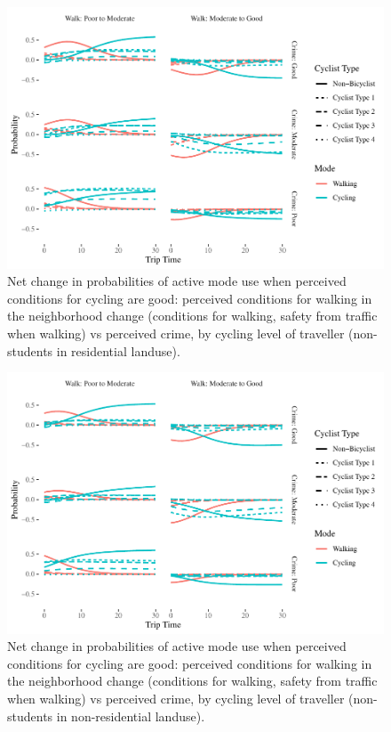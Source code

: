 \documentclass[]{elsarticle} %
\makeatletter
\def\maxwidth{\ifdim\Gin@nat@width>\linewidth\linewidth
\else\Gin@nat@width\fi}
\let\Oldincludegraphics\includegraphics
\renewcommand{\includegraphics}[1]{\Oldincludegraphics[width=\maxwidth]{#1}}
\makeatother
\begin{document}
\begin{figure}
\centering
\includegraphics{Active-Travel-in-Bangladesh_files/figure-latex/figure-comparison-walk-perceptions-change-non-students-residential-1.pdf}
\caption{\label{fig:comparison-walk-perceptions-change-non-students-residential}Net
change in probabilities of active mode use when perceived conditions for
cycling are good: perceived conditions for walking in the neighborhood
change (conditions for walking, safety from traffic when walking) vs
perceived crime, by cycling level of traveller (non-students in
residential landuse).}
\end{figure}

\begin{figure}
\centering
\includegraphics{Active-Travel-in-Bangladesh_files/figure-latex/figure-comparison-walk-perceptions-change-non-students-non-residential-1.pdf}
\caption{\label{fig:comparison-walk-perceptions-change-non-students-non-residential}Net
change in probabilities of active mode use when perceived conditions for
cycling are good: perceived conditions for walking in the neighborhood
change (conditions for walking, safety from traffic when walking) vs
perceived crime, by cycling level of traveller (non-students in
non-residential landuse).}
\end{figure}
\end{document}
